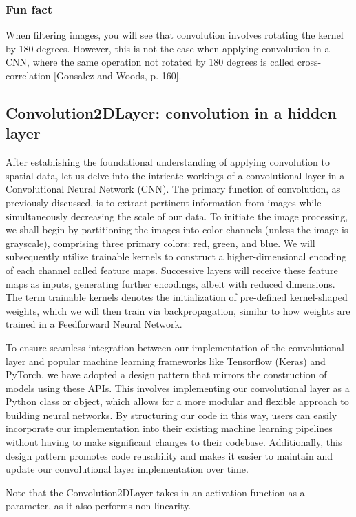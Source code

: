 \documentclass[onecolumn,10pt,cleanfoot]{asme2ej}
\begin{document}
\subsubsection{Fun fact}
When filtering images, you will see that convolution involves rotating the kernel by 180 degrees. However, this is not the case when applying convolution in a CNN, where the same operation not rotated by 180 degrees is called cross-correlation [Gonsalez and Woods, p. 160].

\subsection{Convolution2DLayer: convolution in a hidden layer}
After establishing the foundational understanding of applying convolution to spatial data, let us delve into the intricate workings of a convolutional layer in a Convolutional Neural Network (CNN). The primary function of convolution, as previously discussed, is to extract pertinent information from images while simultaneously decreasing the scale of our data. To initiate the image processing, we shall begin by partitioning the images into color channels (unless the image is grayscale), comprising three primary colors: red, green, and blue. We will subsequently utilize trainable kernels to construct a higher-dimensional encoding of each channel called feature maps. Successive layers will receive these feature maps as inputs, generating further encodings, albeit with reduced dimensions. The term trainable kernels denotes the initialization of pre-defined kernel-shaped weights, which we will then train via backpropagation, similar to how weights are trained in a Feedforward Neural Network.

To ensure seamless integration between our implementation of the convolutional layer and popular machine learning frameworks like Tensorflow (Keras) and PyTorch, we have adopted a design pattern that mirrors the construction of models using these APIs. This involves implementing our convolutional layer as a Python class or object, which allows for a more modular and flexible approach to building neural networks. By structuring our code in this way, users can easily incorporate our implementation into their existing machine learning pipelines without having to make significant changes to their codebase. Additionally, this design pattern promotes code reusability and makes it easier to maintain and update our convolutional layer implementation over time. 

Note that the Convolution2DLayer takes in an activation function as a parameter, as it also performs non-linearity.
\end{document}
